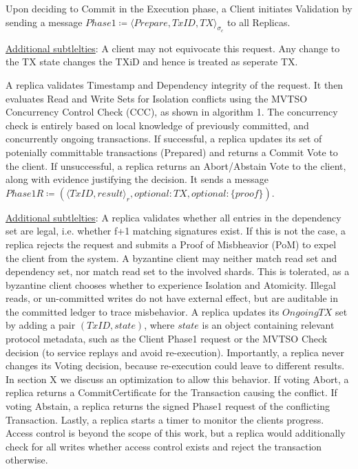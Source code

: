 
Upon deciding to Commit in the Execution phase, a Client initiates Validation by sending a message $Phase1 \coloneqq \langle Prepare, TxID, TX \rangle_{\sigma_c}$ to all Replicas.

\underline{Additional subtlelties}: A client may not equivocate this request. Any change to the TX state changes the TXiD and hence is treated as seperate TX. 

A replica validates Timestamp and Dependency integrity of the request. It then evaluates Read and Write Sets for Isolation conflicts using the MVTSO Concurrency Control Check (CCC), as shown in algorithm 1. The concurrency check is entirely based on local knowledge of previously committed, and concurrently ongoing transactions. If successful, a replica updates its set of potenially committable transactions (Prepared) and returns a Commit Vote to the client. If unsuccessful, a replica returns an Abort/Abstain Vote to the client, along with evidence justifying the decision. It sends a message $Phase1R \coloneqq (\langle TxID, result \rangle_r, optional: TX, optional: \{proof\})$.



\underline{Additional subtlelties}: A replica validates whether all entries in the dependency set are legal, i.e. whether f+1 matching signatures exist. If this is not the case, a replica rejects the request and submits a Proof of Misbheavior (PoM) to expel the client from the system. A byzantine client may neither match read set and dependency set, nor match read set to the involved shards. This is tolerated, as a byzantine client chooses whether to experience Isolation and Atomicity. Illegal reads, or un-committed writes do not have external effect, but are auditable in the committed ledger to trace misbehavior.
A replica updates its $OngoingTX$ set by adding a pair $(TxID, state)$, where $state$ is an object containing relevant protocol metadata, such as the Client Phase1 request or the MVTSO Check decision (to service replays and avoid re-execution). Importantly, a replica never changes its Voting decision, because re-execution could leave to different results. In section X we discuss an optimization to allow this behavior. If voting Abort, a replica returns a CommitCertificate for the Transaction causing the conflict. If voting Abstain, a replica returns the signed Phase1 request of the conflicting Transaction.
Lastly, a replica starts a timer to monitor the clients progress.
Access control is beyond the scope of this work, but a replica would additionally check for all writes whether access control exists and reject the transaction otherwise.


